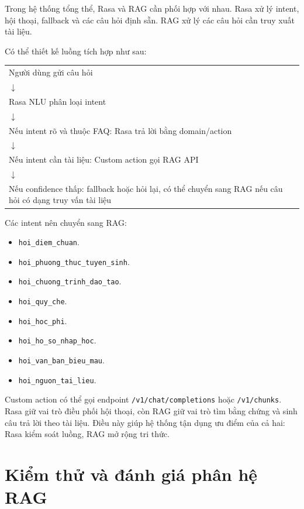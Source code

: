 \documentclass[12pt,a4paper]{report}
\begin{document}
Trong hệ thống tổng thể, Rasa và RAG cần phối hợp với nhau. Rasa xử lý intent, hội thoại, fallback và các câu hỏi định sẵn. RAG xử lý các câu hỏi cần truy xuất tài liệu.

Có thể thiết kế luồng tích hợp như sau:

\begin{center}
\begin{tabular}{p{12cm}}
Người dùng gửi câu hỏi \\
$\downarrow$ \\
Rasa NLU phân loại intent \\
$\downarrow$ \\
Nếu intent rõ và thuộc FAQ: Rasa trả lời bằng domain/action \\
$\downarrow$ \\
Nếu intent cần tài liệu: Custom action gọi RAG API \\
$\downarrow$ \\
Nếu confidence thấp: fallback hoặc hỏi lại, có thể chuyển sang RAG nếu câu hỏi có dạng truy vấn tài liệu
\end{tabular}
\end{center}

Các intent nên chuyển sang RAG:

\begin{itemize}
    \item \texttt{hoi\_diem\_chuan}.
    \item \texttt{hoi\_phuong\_thuc\_tuyen\_sinh}.
    \item \texttt{hoi\_chuong\_trinh\_dao\_tao}.
    \item \texttt{hoi\_quy\_che}.
    \item \texttt{hoi\_hoc\_phi}.
    \item \texttt{hoi\_ho\_so\_nhap\_hoc}.
    \item \texttt{hoi\_van\_ban\_bieu\_mau}.
    \item \texttt{hoi\_nguon\_tai\_lieu}.
\end{itemize}

Custom action có thể gọi endpoint \texttt{/v1/chat/completions} hoặc \texttt{/v1/chunks}. Rasa giữ vai trò điều phối hội thoại, còn RAG giữ vai trò tìm bằng chứng và sinh câu trả lời theo tài liệu. Điều này giúp hệ thống tận dụng ưu điểm của cả hai: Rasa kiểm soát luồng, RAG mở rộng tri thức.

\section{Kiểm thử và đánh giá phân hệ RAG}
\end{document}
